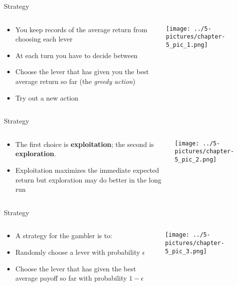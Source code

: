 \documentclass[11pt]{beamer}
\begin{document}
\begin{frame}{Strategy}
\begin{columns}[T] %
\begin{column}{.48\textwidth}
        \begin{itemize}
		\item You keep records of the average return from choosing each lever
		\item At each turn you have to decide between
		\item Choose the lever that has given you the best average return so far (the \textit{greedy action})
		\item Try out a new action
        \end{itemize}
\end{column}%
\hfill%
\begin{column}{.48\textwidth}
        \texttt{[image: ../5-pictures/chapter-5\_pic\_1.png]}
\end{column}%
\end{columns}
\end{frame}
\begin{frame}{Strategy}
\begin{columns}[T] %
\begin{column}{.48\textwidth}
        \begin{itemize}
		\item The first choice is \textbf{exploitation}; the second is \textbf{exploration}.
		\item Exploitation maximizes the immediate expected return but exploration may do better in the long run
        \end{itemize}
\end{column}%
\hfill%
\begin{column}{.48\textwidth}
        \texttt{[image: ../5-pictures/chapter-5\_pic\_2.png]}
\end{column}%
\end{columns}
\end{frame}
\begin{frame}{Strategy}
\begin{columns}[T] %
\begin{column}{.48\textwidth}
        \begin{itemize}
		\item A strategy for the gambler is to:
		\item Randomly choose a lever with probability $\epsilon$
		\item Choose the lever that has given the best average payoff so far with probability $1-\epsilon$
        \end{itemize}
\end{column}%
\hfill%
\begin{column}{.48\textwidth}
        \texttt{[image: ../5-pictures/chapter-5\_pic\_3.png]}
\end{column}%
\end{columns}
\end{frame}
\end{document}
